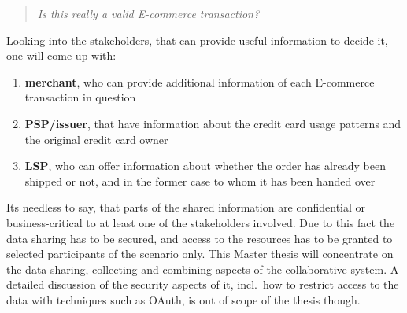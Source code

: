 \begin{quotation}
  \textit{Is this really a valid \gls{E-commerce} transaction?}
\end{quotation}

Looking into the stakeholders, that can provide useful information to decide it, one will come up with:\@

\begin{enumerate}
    \item \textbf{merchant}, who can provide additional information of each \gls{E-commerce} transaction in question
    \item \textbf{\gls{PSP}/issuer}, that have information about the credit card usage patterns and the original credit card owner
    \item \textbf{\gls{LSP}}, who can offer information about whether the order has already been shipped or not, and in the former case to whom it has been handed over
\end{enumerate}

Its needless to say, that parts of the shared information are confidential or business-critical to at least one of the stakeholders involved. Due to this fact the data sharing has to be secured, and access to the resources has to be granted to selected participants of the scenario only. This Master thesis will concentrate on the data sharing, collecting and combining aspects of the collaborative system. A detailed discussion of the security aspects of it, incl.\ how to restrict access to the data with techniques such as OAuth, is out of scope of the thesis though.

